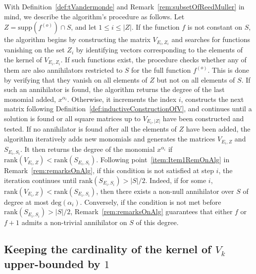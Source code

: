\documentclass[11pt]{llncs}
\begin{document}
With Definition~\ref{def:tVandermonde} and Remark~\ref{rem:subsetOfReedMuller} in mind, we describe the algorithm's procedure as follows. 
Let \( Z = \text{supp}\left(f^{(o)}\right) \cap S \), and let \( 1 \leq i \leq |Z| \). If the function \( f \) is not constant on \( S \), the algorithm begins by constructing the matrix \( V_{E_i, Z_i} \) and searches for functions vanishing on the set \( Z_i \) by identifying vectors corresponding to the elements of the kernel of \( V_{E_i, Z_i} \).
If such functions exist, the procedure checks whether any of them are also annihilators restricted to \( S \) for the full function \( f^{(o)} \). This is done by verifying that they vanish on all elements of \( Z \) but not on all elements of \( S \). If such an annihilator is found, the algorithm returns the degree of the last monomial added, \( x^{\alpha_i} \). Otherwise, it increments the index \( i \), constructs the next matrix following Definition~\ref{def:inductiveConstructionOfV}, and continues until a solution is found or all square matrices up to \( V_{E_i, |Z|} \) have been constructed and tested.
If no annihilator is found after all the elements of \( Z \) have been added, the algorithm iteratively adds new monomials and generates the matrices \( V_{E_i, Z} \) and \( S_{E_i, S_i} \). It then returns the degree of the monomial \( x^{\alpha_i} \) if \( \text{rank}\left(V_{E_i, Z}\right) < \text{rank}\left(S_{E_i, S_i}\right) \). Following point~\ref{item:Item1RemOnAlg} in Remark~\ref{rem:remarksOnAlg}, if this condition is not satisfied at step \( i \), the iteration continues until \( \text{rank}\left(S_{E_i, S_i}\right) > |S| / 2 \).
Indeed, if for some \( i \), \( \text{rank}\left(V_{E_i, Z}\right) < \text{rank}\left(S_{E_i, S_i}\right) \), then there exists a non-null annihilator over \( S \) of degree at most \( \text{deg}(\alpha_i) \). Conversely, if the condition is not met before \( \text{rank}\left(S_{E_i, S_i}\right) > |S| / 2 \), Remark~\ref{rem:remarksOnAlg} guarantees that either \( f \) or \( f+1 \) admits a non-trivial annihilator on \( S \) of this degree.



\subsection{Keeping the cardinality of the kernel of $V_k$ upper-bounded by $1$}
\end{document}
